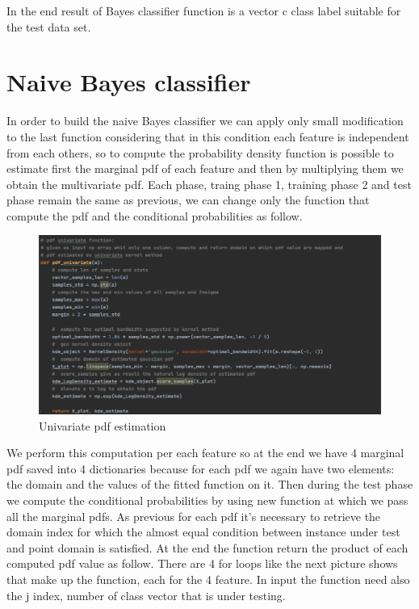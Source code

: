 \documentclass[12pt]{report}
\begin{document}
In the end result of Bayes classifier function is a vector c class label suitable for the test data set.

\section{Naive Bayes classifier}

In order to build the naive Bayes classifier we can apply only small modification to the last function considering that in this condition each feature is independent from each others, so to compute the probability density function is possible to estimate first the marginal pdf of each feature and then by multiplying them we obtain the multivariate pdf. Each phase, traing phase 1, training phase 2 and test phase remain the same as previous, we can change only the function that compute the pdf and the conditional probabilities as follow.

\begin{figure}[h!]
    \centering
    \includegraphics[width=16cm]{Pictures/Univariate pdf.png}
    \caption{Univariate pdf estimation}
\end{figure}

\newpage
We perform this computation per each feature so at the end we have 4 marginal pdf saved into 4 dictionaries because for each pdf we again have two elements: the domain and the values of the fitted function on it. Then during the test phase we compute the conditional probabilities by using new function at which we pass all the marginal pdfs. As previous for each pdf it's necessary to retrieve the domain index for which the almost equal condition between instance under test and point domain is satisfied. At the end the function return the product of each computed pdf value as follow. There are 4 for loops like the next picture shows that make up the function, each for the 4 feature. In input the function need also the j index, number of class vector that is under testing.
\end{document}
